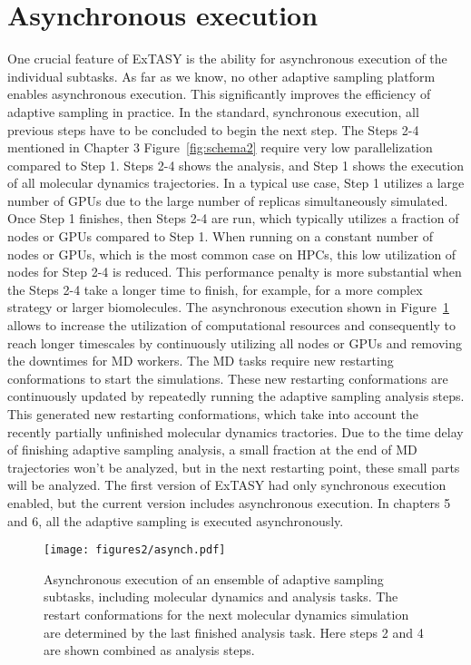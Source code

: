 {\section{\label{sec:asynch}Asynchronous execution}

One crucial feature of ExTASY is the ability for asynchronous execution of the individual subtasks. As far as we know, no other adaptive sampling platform enables asynchronous execution. This significantly improves the efficiency of adaptive sampling in practice. In the standard, synchronous execution, all previous steps have to be concluded to begin the next step. 
The Steps 2-4 mentioned in Chapter 3 Figure~\ref{fig:schema2} require very low parallelization compared to Step 1. Steps 2-4 shows the analysis, and Step 1 shows the execution of all molecular dynamics trajectories. In a typical use case, Step 1 utilizes a large number of GPUs due to the large number of replicas simultaneously simulated. Once Step 1 finishes, then Steps 2-4 are run, which typically utilizes a fraction of nodes or GPUs compared to Step 1. When running on a constant number of nodes or GPUs, which is the most common case on HPCs, this low utilization of nodes for Step 2-4 is reduced. This performance penalty is more substantial when the Steps 2-4 take a longer time to finish, for example, for a more complex strategy or larger biomolecules. The asynchronous execution shown in Figure~\ref{fig:asynch} allows to increase the utilization of computational resources and consequently to reach longer timescales by continuously utilizing all nodes or GPUs and removing the downtimes for MD workers. The MD tasks require new restarting conformations to start the simulations. These new restarting conformations are continuously updated by repeatedly running the adaptive sampling analysis steps. This generated new restarting conformations, which take into account the recently partially unfinished molecular dynamics tractories. Due to the time delay of finishing adaptive sampling analysis, a small fraction at the end of MD trajectories won't be analyzed, but in the next restarting point, these small parts will be analyzed.
The first version of ExTASY\cite{Extasy2016} had only synchronous execution enabled, but the current version\cite{Extasy2019} includes asynchronous execution. In chapters 5 and 6, all the adaptive sampling is executed asynchronously. 

\begin{figure}[h]
  \centering
  \texttt{[image: figures2/asynch.pdf]}
  \caption{Asynchronous execution of an ensemble of adaptive sampling subtasks, including molecular dynamics and analysis tasks. The restart conformations for the next molecular dynamics simulation are determined by the last finished analysis task. Here steps 2 and 4 are shown combined as analysis steps.}
  \label{fig:asynch}
\end{figure}



}
